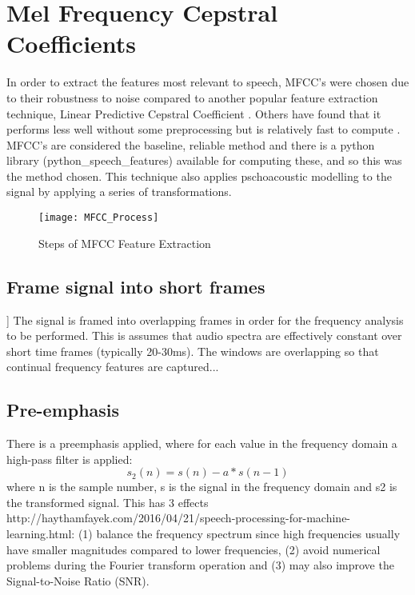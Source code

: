 
\section{Mel Frequency Cepstral Coefficients}

In order to extract the features most relevant to speech, MFCC’s were chosen due to their robustness to noise compared to another popular feature extraction technique, Linear Predictive Cepstral Coefficient \cite{lpccvsmfcc}. Others have found that it performs less well without some preprocessing but is relatively fast to compute \cite{Shrawankar2013}. MFCC’s are considered the baseline, reliable method and there is a python library (python\_speech\_features) available for computing these, and so this was the method chosen.
This technique also applies pschoacoustic modelling to the signal by applying a series of transformations. 

\begin{figure}[h]
	\texttt{[image: MFCC\_Process]}
	\caption{Steps of MFCC Feature Extraction \cite{mfcc_steps}}
	\label{mfcc}
\end{figure}

\subsection{Frame signal into short frames}]
The signal is framed into overlapping frames in order for the frequency analysis to be performed. This is assumes that audio spectra are effectively constant over short time frames (typically 20-30ms). The windows are overlapping so that continual frequency features are captured...

\subsection{Pre-emphasis}
There is a preemphasis applied, where for each value in the frequency domain a high-pass filter is applied:
\begin{equation}
s_{2}(n) = s(n) - a*s(n-1) 
\end{equation}
where n is the sample number, s is the signal in the frequency domain and s2 is the transformed signal. 
This has 3 effects http://haythamfayek.com/2016/04/21/speech-processing-for-machine-learning.html:
(1) balance the frequency spectrum since high frequencies usually have smaller magnitudes compared to lower frequencies,
(2) avoid numerical problems during the Fourier transform operation and
(3) may also improve the Signal-to-Noise Ratio (SNR).

